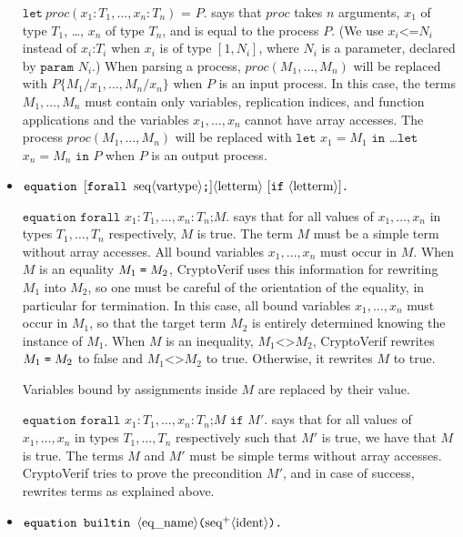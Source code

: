 \begin{itemize}
$\texttt{let}\ \mathit{proc}(x_1:T_1, \dots, x_n:T_n)\texttt{ = }P\texttt{.}$ says that $\mathit{proc}$ takes $n$ arguments, $x_1$ of type $T_1$, \dots, $x_n$ of type $T_n$, and is equal to the process
$P$. (We use $x_i \texttt{<=} N_i$ instead of
  $x_i\texttt{:} T_i$ when $x_i$ is of type $[1,N_i]$, where $N_i$ is
  a parameter, declared by $\texttt{param }N_i$.)
When parsing a process, $\mathit{proc}(M_1, \dots, M_n)$ will be replaced with $P\{M_1/x_1, \dots, M_n/x_n\}$ when $P$ is an input process. In this case, the terms $M_1, \dots, M_n$ must contain only variables, replication indices, and function applications and the variables $x_1, \dots, x_n$ cannot have array accesses.
The process $\mathit{proc}(M_1, \dots, M_n)$ will be replaced with $\texttt{let}$ $x_1 = M_1$ $\texttt{in}$ \dots $\texttt{let}$ $x_n = M_n$ $\texttt{in}$ $P$ when $P$ is an output process.

\item $\texttt{equation }[\texttt{forall }\seq{vartype}\texttt{;}]\nonterm{letterm}\ [\texttt{if}\ \nonterm{letterm}]\texttt{.}$

$\texttt{equation forall }x_1:T_1, \ldots, x_n:T_n\texttt{;}M\texttt{.}$ says
that for all values of $x_1, \ldots, x_n$ in types $T_1, \ldots, T_n$
respectively,
$M$ is true. The term $M$ must be a simple term without array accesses.
All bound variables $x_1, \dots, x_n$ must occur in $M$.
%
When $M$ is an equality $M_1 \mathrel{\texttt{=}}  M_2$, CryptoVerif uses this information
for rewriting $M_1$ into $M_2$, so one must be careful of the orientation
of the equality, in particular for termination. 
In this case, all bound variables $x_1, \dots, x_n$ must occur in $M_1$,
so that the target term $M_2$ is entirely determined knowing the instance of $M_1$.
%
When $M$ is an inequality, $M_1 \texttt{<>} M_2$, CryptoVerif rewrites
$M_1 \mathrel{\texttt{=}}  M_2$ to false and $M_1 \texttt{<>} M_2$ to true.
%
Otherwise, it rewrites $M$ to true.

Variables bound by assignments inside $M$ are replaced by their value.

$\texttt{equation forall }x_1:T_1, \ldots, x_n:T_n\texttt{;}M\texttt{ if }M'\texttt{.}$ says
that for all values of $x_1, \ldots, x_n$ in types $T_1, \ldots, T_n$
respectively such that $M'$ is true, we have that
$M$ is true. The terms $M$ and $M'$ must be simple terms without array accesses.
CryptoVerif tries to prove the precondition $M'$, and in case of success,
rewrites terms as explained above. 


\item $\texttt{equation builtin }\langle\textrm{eq\_name}\rangle\texttt{(}\textrm{seq}^+\langle\textrm{ident}\rangle\texttt{).}$


\end{itemize}
